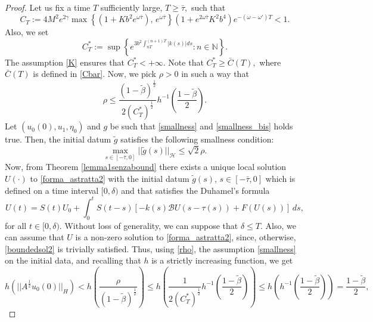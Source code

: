 \documentclass[11pt]{article}
\renewcommand{\geq}{\geqslant}
\renewcommand{\ge}{\geqslant}
\renewcommand{\leq}{\leqslant}
\begin{document}
\begin{proof}
	Let us fix a time $T$ sufficiently large, $T\ge \bar{\tau},$ such that
	\begin{equation}\label{CT}
		C_T:=4M^2e^{2\gamma}\max\left\{(1+Kb^2e^{\omega\bar{\tau}}),\, e^{\omega\bar{\tau}}\right\}\left(1+e^{2\omega\bar{\tau}}K^2b^4\right)e^{-(\omega-\omega')T}<1.
	\end{equation}
 Also, we set 
\begin{equation}\label{C*}
	C^*_T:=\sup\left\{e^{3b^2\int_{nT}^{(n+1)T}\lvert k(s)\rvert ds}: n\in \mathbb{N}\right\}.
\end{equation}
The assumption \eqref{K} ensures that  $C^*_T<+\infty.$
Note that  $C^*_T\ge \bar{C}(T),$ where $\bar{C}(T)$ is defined in \eqref{Cbar}.
Now, we pick $\rho>0$ in such a way that 
\begin{equation}\label{rho}
	\rho\leq \frac{(1-\tilde{\beta})^{\frac{1}{2}}}{2(C^*_T)^{\frac{1}{2}}}h^{-1}\left(\frac{1-\tilde{\beta}}{2}\right).
\end{equation} 
Let $(u_0(0),u_1,\eta_0)$ and $g$ be such that \eqref{smallness} and \eqref{smallness_bis}   holds true. Then, the initial datum $\tilde{g}$  satisfies the following smallness condition:
\begin{equation}\label{smallness2}
	\max_{s\in [-\bar{\tau},0]}||\tilde g(s)||_{\mathcal H}\leq \sqrt{2} \rho.
\end{equation}
Now, from Theorem \ref{lemma1senzabound} there exists a unique local solution $U(\cdot)$ to \eqref{forma_astratta2} with the initial datum $\tilde{g}(s)$, $s\in[-\bar{\tau},0]$ which is defined on a time interval $[0,\delta)$ and that satisfies the Duhamel's formula
\begin{equation}\label{primasol}
	U(t)=S(t)U_0+\int_{0}^{t}S(t-s)[-k(s)\mathcal{B}U(s-\tau(s))+F(U(s))]\,ds,
\end{equation} 
for all $t\in [0,\delta)$. Without loss of generality, we can suppose that $\delta\leq T$. Also, we can assume that $U$ is a non-zero solution to \eqref{forma_astratta2}, since, otherwise, \eqref{boundedsol2} is trivially satisfied. Thus, using \eqref{rho}, the assumption \eqref{smallness} on the initial data,
 and recalling that $h$ is a strictly increasing function, we get
$$h(||A^{\frac{1}{2}}u_0(0)||_{H})< h\left(\frac{\rho}{(1-\tilde{\beta})^{\frac{1}{2}}}\right)\leq h\left(\frac{1}{2(C_T^*)^{\frac{1}{2}}}h^{-1}\left(\frac{1-\tilde{\beta}}{2}\right)\right)\leq h\left(h^{-1}\left(\frac{1-\tilde{\beta}}{2}\right)\right)=\frac{1-\tilde{\beta}}{2},$$

\end{proof}
\end{document}
